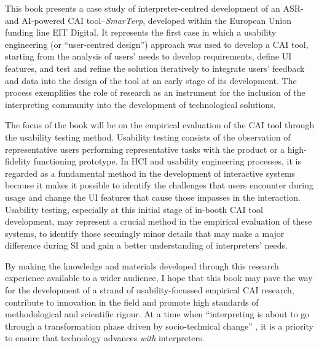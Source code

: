 This book presents a case study of interpreter-centred development of an ASR- and AI-powered CAI tool--\textit{SmarTerp}, developed within the European Union funding line EIT Digital. It represents the first case in which a usability engineering (or “user-centred design”) approach was used to develop a CAI tool, starting from the analysis of users’ needs to develop requirements, define UI features, and test and refine the solution iteratively to integrate users’ feedback and data into the design of the tool at an early stage of its development. The process exemplifies the role of research as an instrument for the inclusion of the interpreting community into the development of technological solutions.

The focus of the book will be on the empirical evaluation of the CAI tool through the usability testing method. Usability testing consists of the observation of representative users performing representative tasks with the product or a high-fidelity functioning prototype. In HCI and usability engineering processes, it is regarded as a fundamental method in the development of interactive systems because it makes it possible to identify the challenges that users encounter during usage and change the UI features that cause those impasses in the interaction. Usability testing, especially at this initial stage of in-booth CAI tool development, may represent a crucial method in the empirical evaluation of these systems, to identify those seemingly minor details that may make a major difference during SI and gain a better understanding of interpreters’ needs.

By making the knowledge and materials developed through this research experience available to a wider audience, I hope that this book may pave the way for the development of a strand of usability-focussed empirical CAI research, contribute to innovation in the field and promote high standards of methodological and scientific rigour. At a time when ``interpreting is about to go through a transformation phase driven by socio-technical change'' \citep[8]{fantinuoli2018a}, it is a priority to ensure that technology advances \textit{with} interpreters.\largerpage[2]

